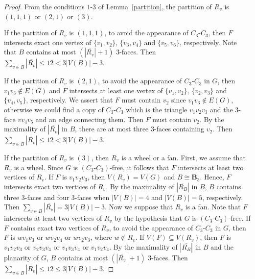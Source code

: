 \documentclass[10pt,a4paper]{amsart}
\begin{document}
\begin{proof}
    From the conditions $1$-$3$ of Lemma~\ref{partition}, the partition of $R_v$ is $(1,1,1)$ or $(2,1)$ or $(3)$.
    
    If the partition of $R_v$ is $(1,1,1)$, to avoid the appearance of $C_3\textbf{-}C_3$, then $F$ intersects exact one vertex of $\{v_1,v_2\}$, $\{v_3,v_4\}$ and $\{v_5,v_6\}$, respectively. Note that $B$ contains at most $(|\overline{R_v}|+1)$ $3$-faces. Then $\sum_{v \in B}|\overline{R_v}| \leq 12 < 3|V(B)|-3$.

    If the partition of $R_v$ is $(2,1)$, to avoid the appearance of $C_3\textbf{-}C_3$ in $G$, then $v_1v_3\notin E(G)$ and $F$ intersects at least one vertex of $\{v_1,v_2\}$, $\{v_2,v_3\}$ and $\{v_4,v_5\}$, respectively. 
    We assert that $F$ must contain $v_2$ since $v_1v_3\notin E(G)$, otherwise we could find a copy of $C_3\textbf{-}C_3$ which is the triangle $v_1v_2v_3$ and the $3$-face $vv_4v_5$ and an edge connecting them. 
    Then $F$ must contain $v_2$. By the maximality of $|\overline{R_v}|$ in $B$, there are at most three $3$-faces containing $v_2$. 
    Then $\sum_{v \in B}|\overline{R_v}| \leq 12 < 3|V(B)|-3$.

    If the partition of $R_v$ is $(3)$, then $R_v$ is a wheel or a fan. First, we assume that $R_v$ is a wheel.
    Since $G$ is $(C_3\textbf{-}C_3)$-free, it follows that $F$ intersects at least two vertices of $R_v$.
    If $F$ is $v_1v_2v_3$, then $V(R_v)=V(G)$ and $B\cong\mathbf{B}_3$.
    Hence, $F$ intersects exact two vertices of $R_v$.
    By the maximality of $|\overline{R_B}|$ in $B$, $B$ contains three $3$-faces and four $3$-faces when $|V(B)|=4$ and $|V(B)|=5$, respectively. 
    Then $\sum_{v \in B}|\overline{R_v}| = 3|V(B)|-3$.
    Now we suppose that $R_v$ is a fan. Note that $F$ intersects at least two vertices of $R_v$ by the hypothesis that $G$ is $(C_3\textbf{-}C_3)$-free. 
    If $F$ contains exact two vertices of $R_v$, to avoid the appearance of $C_3\textbf{-}C_3$ in $G$, then $F$ is $wv_1v_3$ or $wv_2v_4$ or $wv_2v_3$, where $w\notin R_v$.
    If $V(F)\subseteq V(R_v)$, then $F$ is $v_1v_2v_3$ or $v_2v_3v_4$ or $v_1v_3v_4$ or $v_1v_2v_4$.
    By the maximality of $|\overline{R_B}|$ in $B$ and the planarity of $G$, $B$ contains at most $(|\overline{R_v}|+1)$ $3$-faces. 
    Then $\sum_{v \in B}|\overline{R_v}| \leq 12 \leq 3|V(B)|-3$.
\end{proof}
\end{document}
